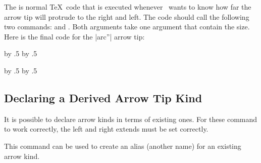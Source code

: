 \begin{command}{\pgfarrowsdeclare{}}
  The  is normal \TeX\ code that is executed
  whenever \pgfname\ wants to know how far the arrow tip will protrude
  to the right and left. The code should call the following two
  commands: \declare{|\pgfarrowsrightextend|} and
  \declare{|\pgfarrowsleftextend|}. Both arguments take one argument
  that contain the size. Here is the final code for the |arc''| arrow
  tip: 
\begin{codeexample}[]
{
  \arrowsize=0.2pt
  \advance\arrowsize by .5\pgflinewidth
  \pgfarrowsleftextend{-4\arrowsize-.5\pgflinewidth}
  \pgfarrowsrightextend{.5\pgflinewidth}
}
{
  \arrowsize=0.2pt
  \advance\arrowsize by .5\pgflinewidth
  \pgfsetdash{}{0pt} %
  \pgfsetroundjoin   %
  \pgfsetroundcap    %
  \pgfpathmoveto{\pgfpoint{-4\arrowsize}{4\arrowsize}}
  \pgfusepathqstroke
  \pgfpathmoveto{\pgfpointorigin}
  \pgfusepathqstroke
}
\end{codeexample}
\end{command}

{
  \arrowsize=0.2pt
  \advance\arrowsize by .5\pgflinewidth
  \pgfarrowsleftextend{-4\arrowsize-.5\pgflinewidth}
  \pgfarrowsrightextend{.5\pgflinewidth}
}
{
  \arrowsize=0.2pt
  \advance\arrowsize by .5\pgflinewidth
  \pgfsetdash{}{0pt} %
  \pgfsetroundjoin   %
  \pgfsetroundcap    %
  \pgfpathmoveto{\pgfpoint{-4\arrowsize}{4\arrowsize}}
  \pgfusepathqstroke
  \pgfpathmoveto{\pgfpointorigin}
  \pgfusepathqstroke
}


\subsection{Declaring a Derived Arrow Tip Kind}

It is possible to declare arrow kinds in terms of existing ones. For
these command to work correctly, the left and right extends must be
set correctly.

\begin{command}{\pgfarrowsdeclarealias{}}
  This command can be used to create an alias (another name) for an
  existing arrow kind.

\begin{codeexample}[]
%
\begin{pgfpicture}
  \pgfsetarrows{<->}
  \pgfsetlinewidth{1ex}
  \pgfpathmoveto{\pgfpointorigin}
  \pgfpathlineto{\pgfpoint{4cm}{2cm}}
\end{pgfpicture}
\end{codeexample}
\end{command}



